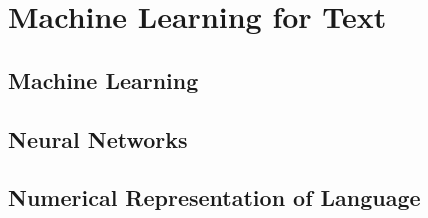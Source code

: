 \chapter{Machine Learning for Text}
\section{Machine Learning}

\section{Neural Networks}

\section{Numerical Representation of Language}

%
